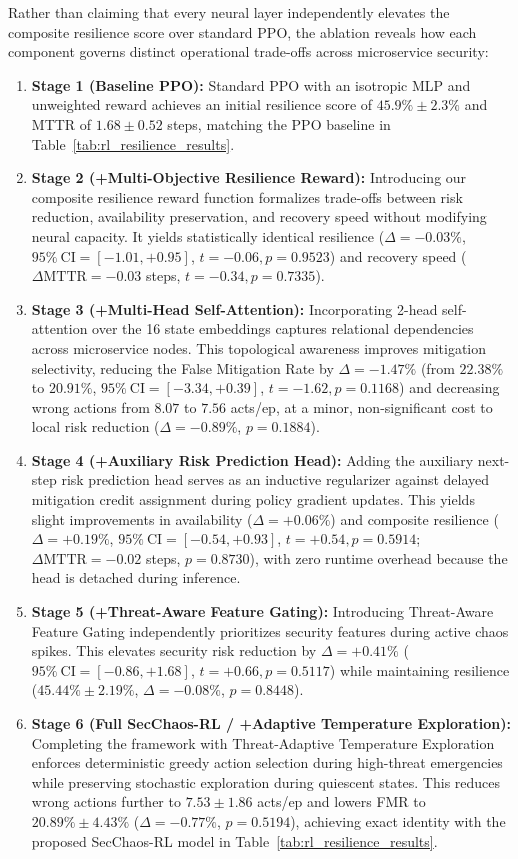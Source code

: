 \documentclass[ASNA,twocolumn]{USG}
\begin{document}
Rather than claiming that every neural layer independently elevates the composite resilience score over standard PPO, the ablation reveals how each component governs distinct operational trade-offs across microservice security:
\begin{enumerate}
    \item \textbf{Stage 1 (Baseline PPO):} Standard PPO with an isotropic MLP and unweighted reward achieves an initial resilience score of $45.9\% \pm 2.3\%$ and MTTR of $1.68 \pm 0.52$ steps, matching the PPO baseline in Table~\ref{tab:rl_resilience_results}.
    \item \textbf{Stage 2 (+Multi-Objective Resilience Reward):} Introducing our composite resilience reward function formalizes trade-offs between risk reduction, availability preservation, and recovery speed without modifying neural capacity. It yields statistically identical resilience ($\Delta = -0.03\%$, $95\%\ \text{CI} = [-1.01, +0.95]$, $t = -0.06, p = 0.9523$) and recovery speed ($\Delta \text{MTTR} = -0.03$ steps, $t = -0.34, p = 0.7335$).
    \item \textbf{Stage 3 (+Multi-Head Self-Attention):} Incorporating 2-head self-attention over the 16 state embeddings captures relational dependencies across microservice nodes. This topological awareness improves mitigation selectivity, reducing the False Mitigation Rate by $\Delta = -1.47\%$ (from $22.38\%$ to $20.91\%$, $95\%\ \text{CI} = [-3.34, +0.39]$, $t = -1.62, p = 0.1168$) and decreasing wrong actions from $8.07$ to $7.56$ acts/ep, at a minor, non-significant cost to local risk reduction ($\Delta = -0.89\%$, $p = 0.1884$).
    \item \textbf{Stage 4 (+Auxiliary Risk Prediction Head):} Adding the auxiliary next-step risk prediction head serves as an inductive regularizer against delayed mitigation credit assignment during policy gradient updates. This yields slight improvements in availability ($\Delta = +0.06\%$) and composite resilience ($\Delta = +0.19\%$, $95\%\ \text{CI} = [-0.54, +0.93]$, $t = +0.54, p = 0.5914$; $\Delta \text{MTTR} = -0.02$ steps, $p = 0.8730$), with zero runtime overhead because the head is detached during inference.
    \item \textbf{Stage 5 (+Threat-Aware Feature Gating):} Introducing Threat-Aware Feature Gating independently prioritizes security features during active chaos spikes. This elevates security risk reduction by $\Delta = +0.41\%$ ($95\%\ \text{CI} = [-0.86, +1.68]$, $t = +0.66, p = 0.5117$) while maintaining resilience ($45.44\% \pm 2.19\%$, $\Delta = -0.08\%$, $p = 0.8448$).
    \item \textbf{Stage 6 (Full SecChaos-RL / +Adaptive Temperature Exploration):} Completing the framework with Threat-Adaptive Temperature Exploration enforces deterministic greedy action selection during high-threat emergencies while preserving stochastic exploration during quiescent states. This reduces wrong actions further to $7.53 \pm 1.86$ acts/ep and lowers FMR to $20.89\% \pm 4.43\%$ ($\Delta = -0.77\%$, $p = 0.5194$), achieving exact identity with the proposed SecChaos-RL model in Table~\ref{tab:rl_resilience_results}.
\end{enumerate}
\end{document}
